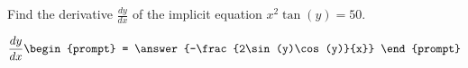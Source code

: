 \documentclass{ximera}
\author{Gregory Hartman \and Matthew Carr}
\begin{document}
\begin{exercise}




Find the derivative $\frac{dy}{dx}$ of the implicit equation $x^2\tan(y)=50$.

\[
\frac{dy}{dx}
\begin{prompt}
= \answer{-\frac{2\sin(y)\cos(y)}{x}}
\end{prompt}
\]


\end{exercise}
\end{document}
